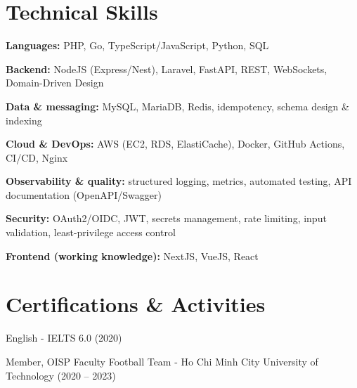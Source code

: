 \section{Technical Skills}
\begin{onecolentry}
\begin{highlights}
    \item \textbf{Languages:} PHP, Go, TypeScript/JavaScript, Python, SQL
    \item \textbf{Backend:} NodeJS (Express/Nest), Laravel, FastAPI, REST, WebSockets, Domain-Driven Design
    \item \textbf{Data \& messaging:} MySQL, MariaDB, Redis, idempotency, schema design \& indexing
    \item \textbf{Cloud \& DevOps:} AWS (EC2, RDS, ElastiCache), Docker, GitHub Actions, CI/CD, Nginx
    \item \textbf{Observability \& quality:} structured logging, metrics, automated testing, API documentation (OpenAPI/Swagger)
    \item \textbf{Security:} OAuth2/OIDC, JWT, secrets management, rate limiting, input validation, least-privilege access control
    \item \textbf{Frontend (working knowledge):} NextJS, VueJS, React
\end{highlights}
\end{onecolentry}


\section{Certifications \& Activities}
\begin{onecolentry}
    \begin{highlights}
        \item English - IELTS 6.0 (2020)
        \item Member, OISP Faculty Football Team - Ho Chi Minh City University of Technology (2020 -- 2023)
    \end{highlights}
\end{onecolentry}
